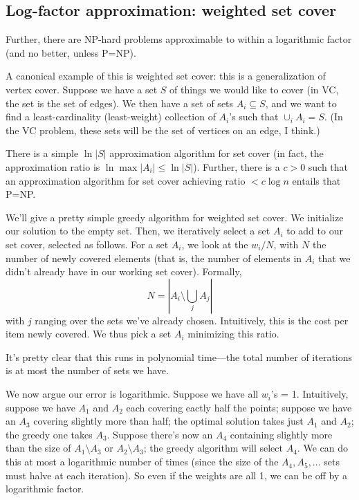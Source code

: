 \documentclass{article}
\begin{document}
\subsection{Log-factor approximation: weighted set cover}

Further, there are NP-hard problems approximable to within a logarithmic
factor (and no better, unless P=NP).

A canonical example of this is weighted set cover: this is a generalization of 
vertex cover. Suppose we have a set $S$ of things we would like to cover (in
VC, the set is the set of edges).
We then have a set of sets $A_i \subseteq S$, and we want to find a 
least-cardinality (least-weight) collection of $A_i$'s 
such that $\cup_i A_i = S$.
(In the VC problem, these sets will be the set of vertices on an edge, 
I think.)

There is a simple $\ln |S|$ approximation algorithm for set cover (in
fact, the approximation ratio is $\ln \max|A_i| \leq \ln |S|$).
Further, there is a $c> 0$ such that an approximation algorithm for set cover
 achieving ratio
$< c\log n$ entails that P=NP.

We'll give a pretty simple greedy algorithm for weighted set cover.
We initialize our solution to the empty set.
Then, we iteratively select a set $A_i$ to add to our set cover, selected
as follows.
For a set $A_i$, we look at the 
$
w_i / N
$, with $N$ the number of newly covered elements (that is, the number of
elements in $A_i$ that we didn't already have in our working set cover).
Formally,
$$
N = \left|
	A_i \setminus \bigcup_j A_j
\right|
$$
with $j$ ranging over the sets we've already chosen.
Intuitively, this is the cost per item newly covered.
We thus pick a set $A_i$ minimizing this ratio.

It's pretty clear that this runs in polynomial time---the total number of
iterations is at most the number of sets we have.

We now argue our error is logarithmic. Suppose we have all $w_i$'s = 1.
Intuitively, suppose we have $A_1$ and $A_2$ each covering eactly half
the points; suppose we have an $A_3$ covering slightly more than half;
the optimal solution takes just $A_1$ and $A_2$; the greedy one takes
$A_3$. Suppose there's now an $A_4$ containing slightly more than the size
of $A_1 \setminus A_3$ or $A_2 \setminus A_3$; the greedy algorithm will
select $A_4$. We can do this at most a logarithmic number of times (since
the size of the $A_4, A_5, \ldots$ sets must halve at each iteration).
So even if the weights are all 1, we can be off by a logarithmic factor.
\end{document}
